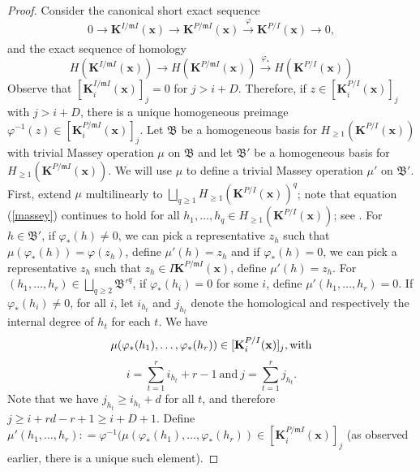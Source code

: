 \documentclass[10pt,reqno]{amsart}
\theoremstyle{definition}
\theoremstyle{remark}
\numberwithin{equation}{section}
\newcommand{\m}{\mathfrak m}
\numberwithin{equation}{section}
\begin{document}
 \begin{proof}
 Consider the canonical short exact sequence
     \[
     0\xrightarrow[]{}\mathbf{K}^{I/\m I}(\textbf{x})\xrightarrow[]{} \mathbf{K}^{P/\m I}(\textbf{x})\xrightarrow[]{\varphi}\mathbf{K}^{P/I}(\textbf{x})\xrightarrow[]{}0,
     \]
     and the exact sequence of homology \[
      H(\mathbf{K}^{I/\m I}(\textbf{x}))\xrightarrow[]{} H(\mathbf{K}^{P/\m I}(\textbf{x}))\xrightarrow[]{\varphi_*}H(\mathbf{K}^{P/I}(\textbf{x}))
     \]
     Observe that 
    $ [\mathbf{K}_i^{I/\m I}(\textbf{x})]_j=0$ for $j>i+D$. Therefore, if 
    $z\in [\mathbf{K}_i^{P/I}(\textbf{x})]_j$
    with $j>i+D$, there is a unique homogeneous preimage $\varphi^{-1}(z)\in [\mathbf{K}_i^{P/\m I}(\textbf{x})]_j.$
    Let $\mathfrak B$ be a homogeneous basis for $ H_{\geq 1}(\mathbf{K}^{P/ I}(\textbf{x}))$ with trivial Massey operation $\mu$ on $\mathfrak B$ and let $\mathfrak B'$ be a homogeneous basis for $ H_{\geq 1}(\mathbf{K}^{P/\m I}(\textbf{x}))$. We will use $\mu$ to define a trivial Massey operation $\mu'$ on $\mathfrak B'$. First, extend $\mu$ multilinearly to $\bigsqcup_{q\geq 1}H_{\geq 1}(\mathbf{K}^{P/I}(\textbf{x}))^{q}$; note that equation (\ref{massey}) continues to hold for all $h_1, \ldots, h_q\in H_{\geq 1}(\mathbf{K}^{P/I}(\textbf{x}))$; see \cite[Lemma 11.2]{avramov2013contravariant}.
    For $h\in \mathfrak B'$, if $\varphi_*(h)\neq 0$, we can pick a representative $z_h$
    such that $\mu(\varphi_*(h))=\varphi (z_h)$, define $\mu'(h)=z_h $ and if $\varphi_*(h)=0$, we can pick a representative $z_h$ such that $z_h\in I\mathbf{K}^{P/\m I}(\textbf{x})$, define $\mu'(h)=z_h $. For $(h_1,\ldots,h_{r})\in \bigsqcup _{q\geq 2} \mathfrak B'^q$, if $\varphi_*(h_i)=0$ for some $i$, define $\mu'(h_1,\ldots,h_{r})=0$. If  $\varphi_*(h_i)\neq 0$, for all $i$, let $i_{h_t}$ and $j_{h_t}$ denote the homological and respectively the internal degree of $h_t$ for each $t$. We have  
    \[\mu(\varphi_{*} (h_1),\ldots,\varphi_{*}(h_r))\in [\mathbf K_i^{P/I}({\bf x})]_j, 
    \text{with} \]
    \[i=\sum_{t=1}^r i_{h_t}+r-1 \ \text{and}\ j=\sum_{t=1}^r j_{h_t}.\] Note that we have $j_{h_t}\ge i_{h_t}+d$
    for all $t$, and therefore $j\ge i+rd-r+1\ge i+D+1.$
     Define $ \mu'(h_1,\ldots,h_r): = \varphi^{-1} (\mu(\varphi_{*} (h_1),\ldots,\varphi_{*}(h_r))\in [\mathbf{K}_i^{P/\m I}(\textbf{x})]_j$ (as observed earlier, there is a unique such element).


\end{proof}
\end{document}
